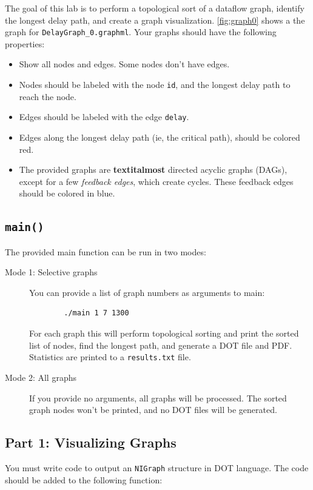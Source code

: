 The goal of this lab is to perform a topological sort of a dataflow graph, identify the longest delay path, and create a graph visualization.  \cref{fig:graph0} shows a the graph for \texttt{DelayGraph\_0.graphml}. 
Your graphs should have the following properties:
\begin{itemize}
	\item Show all nodes and edges. Some nodes don't have edges.
	\item Nodes should be labeled with the node {\tt id}, and the longest delay path to reach the node.
	\item Edges should be labeled with the edge {\tt delay}.
	\item Edges along the longest delay path (ie, the critical path), should be colored red.
	\item The provided graphs are \textbf{textit{almost}} directed acyclic graphs (DAGs), except for a few \textit{feedback edges}, which create cycles.  These feedback edges should be colored in blue.
\end{itemize}

\subsection{\texttt{main()}}

The provided main function can be run in two modes:

\begin{description}
	\item[Mode 1: Selective graphs] You can provide a list of graph numbers as arguments to main: 
	\begin{lstlisting}
		./main 1 7 1300
	\end{lstlisting}
	For each graph this will perform topological sorting and print the sorted list of nodes, find the longest path, and generate a DOT file and PDF.  Statistics are printed to a \texttt{results.txt} file.
	\item[Mode 2: All graphs] If you provide no arguments, all graphs will be processed.  The sorted graph nodes won't be printed, and no DOT files will be generated.
\end{description}


\subsection{Part 1: Visualizing Graphs}
\label{sec:del1}

You must write code to output an {\tt NIGraph} structure in DOT language.  The code should be added to the following function:

